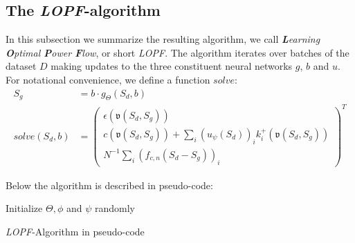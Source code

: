 \subsection{The \emph{LOPF}-algorithm}
\label{sec:LOPFalgo}
In this subsection we summarize the resulting algorithm, we call \emph{\textbf{L}earning \textbf{O}ptimal \textbf{P}ower \textbf{F}low}, or short \emph{LOPF}. The algorithm iterates over batches of the dataset $D$ making updates to the three constituent neural networks $g$, $b$ and $u$. For notational convenience, we define a function $solve$:
\begin{align*}
S_g &= b \cdot g_\Theta(S_d, b)\\
solve(S_d,b)
&=
\begin{pmatrix}
\epsilon(\mathfrak{v}(S_d,S_g)) \\
 c(\mathfrak{v}(S_d,S_g)) + \sum_i (u_\psi(S_d))_i k^+_i(\mathfrak{v}(S_d,S_g)) \\
N^{-1}\sum_i (f_{c,n}(S_d - S_g))_i
\end{pmatrix}^T
\end{align*}

 Below the algorithm is described in pseudo-code:


\begin{algorithm}[htb]
Initialize $\Theta, \phi$ and $\psi$ randomly\;
\caption{\emph{LOPF}-Algorithm in pseudo-code}
\end{algorithm}

